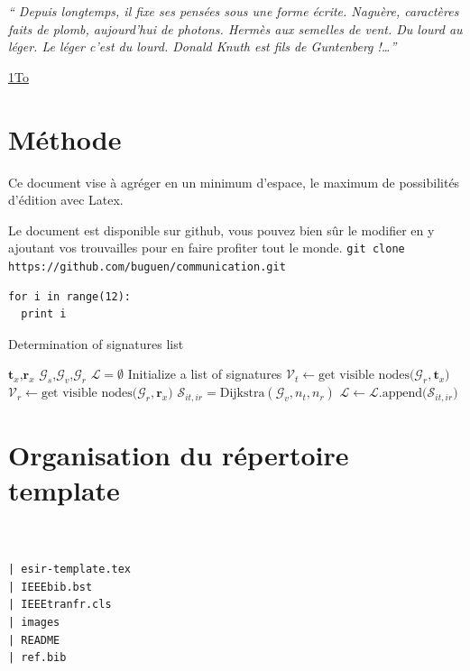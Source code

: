 \documentclass[twocolumn,a4paper]{IEEEtranfr}
\newcommand{\mc}[1]{\mathcal{#1}}
\begin{document}
{\textit
{`` Depuis longtemps, il fixe ses pensées sous une forme écrite.
Naguère, caractères faits de plomb, aujourd'hui de photons. Hermès aux semelles de vent. Du lourd au léger. Le léger c'est du lourd. 
Donald Knuth est fils de Guntenberg !\dots''}

\href{http://micro.lemondeinformatique.fr/nouveaux-produits/lire-datatraveler-hyperx-predator-19600.html}{1To}
\section{Méthode}

Ce document vise à agréger en un minimum d'espace, le maximum de possibilités
d'édition avec Latex.

Le document est disponible sur github,  vous pouvez bien sûr le modifier en y ajoutant
vos trouvailles pour en faire profiter tout le monde.
{\tt git clone https://github.com/buguen/communication.git}
\begin{lstlisting}
for i in range(12):
  print i
\end{lstlisting}

\begin{algorithm}               %
\label{alg1}                           %
\caption{Determination of signatures list}
\begin{algorithmic}                    %
\REQUIRE $\mathbf{t}_x$,$\mathbf{r}_x$
\REQUIRE $\mc{G}_s$,$\mc{G}_v$,$\mc{G}_r$
\STATE $\mathcal{L} = \emptyset $ Initialize a list of signatures
\STATE $\mathcal{V}_t \leftarrow \textrm{get visible nodes(}\mc{G}_r,\mathbf{t}_x\textrm{)}$
\STATE $\mathcal{V}_r \leftarrow \textrm{get visible nodes(}\mc{G}_r,\mathbf{r}_x\textrm{)}$
\STATE $\mc{S}_{it,ir}  = \textrm{Dijkstra}(\mc{G}_v,n_t,n_r)$
\STATE $\mathcal{L}\leftarrow \mathcal{L}.\textrm{append(}\mc{S}_{it,ir}\textrm{)}$
\ENDFOR
\ENDFOR
\end{algorithmic}
\end{algorithm}

\section{Organisation du répertoire template}

\begin{verbatim}


| esir-template.tex
| IEEEbib.bst
| IEEEtranfr.cls
| images
| README
| ref.bib


\end{verbatim}}
\end{document}
